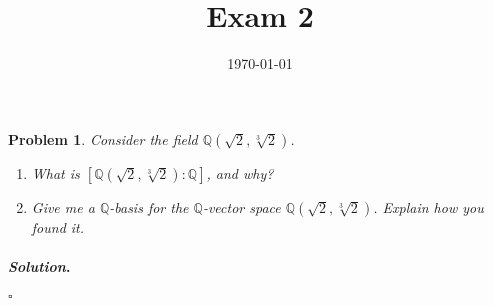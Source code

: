 \documentclass[reqno]{amsart}
\theoremstyle{plain}
\newtheorem{problem}{Problem}
\theoremstyle{definition}
\newenvironment{solution}{\paragraph{\emph{Solution}.}}{\hfill$\square$}
\begin{document}
 

\title[Exam 2]{Exam 2}

\date{\today} 
\maketitle 


\begin{problem}
Consider the field $\mathbb{Q}(\sqrt{2},\sqrt[3]{2})$.
\begin{enumerate}
\item What is $[\mathbb{Q}(\sqrt{2},\sqrt[3]{2}):\mathbb{Q}]$, and why?
\item Give me a $\mathbb{Q}$-basis for the $\mathbb{Q}$-vector space $\mathbb{Q}(\sqrt{2},\sqrt[3]{2})$.  Explain how you found it.
\end{enumerate}
\end{problem}
\begin{solution}

\end{solution}
\end{document}
